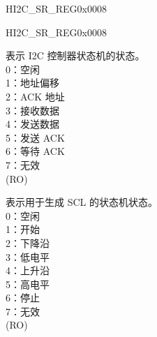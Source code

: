 \begin{register}{H}{I2C\_SR\_REG}{0x0008}
\begin{regdesc}
\begin{reglist}
    \item [见下页...]
    \end{reglist}\end{regdesc}
    \end{register}
    \addtocounter{Regfloat}{-1}
    \begin{register}{H}{I2C\_SR\_REG}{0x0008}
    \begin{regdesc}\begin{reglist}
    \item [...接上页]

    \label{fielddesc:I2CSCLMAINSTATELAST}\item [I2C\_SCL\_MAIN\_STATE\_LAST] 表示 I2C 控制器状态机的状态。\\
    0：空闲\\
    1：地址偏移\\
    2：ACK 地址\\
    3：接收数据\\
    4：发送数据\\
    5：发送 ACK\\
    6：等待 ACK\\
    7：无效\\
    (RO)
    \label{fielddesc:I2CSCLSTATELAST}\item [I2C\_SCL\_STATE\_LAST] 表示用于生成 SCL 的状态机状态。\\
    0：空闲\\
    1：开始\\
    2：下降沿\\
    3：低电平\\
    4：上升沿\\
    5：高电平\\
    6：停止\\
    7：无效\\
    (RO)
    \end{reglist}\end{regdesc}
    \end{register}


